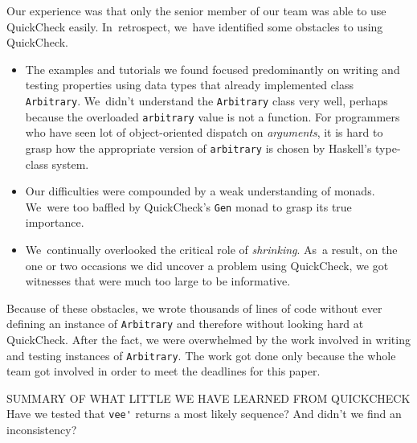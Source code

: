 \documentclass[nonatbib,preprint,blockstyle,times]{sigplanconf}
\begin{document}
Our experience was that only the senior member of our team was able to use
QuickCheck easily.
In~retrospect, we~have identified some obstacles to using
QuickCheck.
\begin{itemize}
\item
The examples and tutorials we found focused 
predominantly on writing and testing properties using data types that
already implemented class \texttt{Arbitrary}.
We~didn't understand the \texttt{Arbitrary} class very well, 
perhaps because the overloaded \texttt{arbitrary} value is not a
function.
For programmers who have seen lot of object-oriented dispatch
on \emph{arguments}, it is hard to grasp how the appropriate version
of \texttt{arbitrary} is chosen by Haskell's type-class system.
\item
Our difficulties were compounded by a weak understanding of monads.
We~were too baffled by QuickCheck's \texttt{Gen} monad to grasp its
true importance.
\item
We~continually overlooked the critical role of \emph{shrinking}.
As~a result, on the one or two occasions we did uncover a problem
using QuickCheck, we got witnesses that were much too large to be
informative. 
\end{itemize}
Because of these obstacles, 
we wrote thousands of lines of code without ever defining an instance
of \texttt{Arbitrary} and therefore
without looking hard at QuickCheck.
After the fact, we were overwhelmed by the work
involved in writing and testing instances
of
\texttt{Arbitrary}.
The work got done only because the whole team got involved in order to
meet the deadlines for this paper.

SUMMARY OF WHAT LITTLE WE HAVE LEARNED FROM QUICKCHECK
Have we tested that \verb+vee'+ returns a most likely sequence?
And didn't we find an inconsistency?

\end{document}
